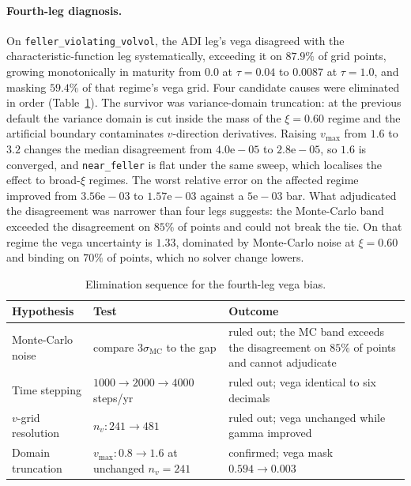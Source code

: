 \documentclass{article}
\begin{document}
\paragraph{Fourth-leg diagnosis.} On \texttt{feller\_violating\_volvol}, the ADI
leg's vega disagreed with the characteristic-function leg systematically, exceeding
it on $87.9\%$ of grid points, growing monotonically in maturity from $0.0$ at
$\tau = 0.04$ to $0.0087$ at $\tau = 1.0$, and masking $59.4\%$ of that regime's
vega grid. Four candidate causes were eliminated in order
(Table~\ref{tab:adi}). The survivor was variance-domain truncation: at the previous
default the variance domain is cut inside the mass of the $\xi = 0.60$ regime and
the artificial boundary contaminates $v$-direction derivatives. Raising $v_{\max}$
from $1.6$ to $3.2$ changes the median disagreement from $4.0\mathrm{e}{-}05$ to
$2.8\mathrm{e}{-}05$, so $1.6$ is converged, and \texttt{near\_feller} is flat under
the same sweep, which localises the effect to broad-$\xi$ regimes. The worst
relative error on the affected regime improved from $3.56\mathrm{e}{-}03$ to
$1.57\mathrm{e}{-}03$ against a $5\mathrm{e}{-}03$ bar. What adjudicated the
disagreement was narrower than four legs suggests: the Monte-Carlo band exceeded the
disagreement on $85\%$ of points and could not break the tie. On that regime the
vega uncertainty is $1.33$, dominated by Monte-Carlo noise at $\xi = 0.60$ and
binding on $70\%$ of points, which no solver change lowers.

\begin{table}[h]
\caption{Elimination sequence for the fourth-leg vega bias.}
\label{tab:adi}
\centering\footnotesize
\begin{tabular}{@{}lll@{}}
\toprule
Hypothesis & Test & Outcome \\
\midrule
Monte-Carlo noise & compare $3\sigma_{\mathrm{MC}}$ to the gap & ruled out; the MC band exceeds the disagreement on $85\%$ of points and cannot adjudicate \\
Time stepping & $1000 \to 2000 \to 4000$ steps/yr & ruled out; vega identical to six decimals \\
$v$-grid resolution & $n_v: 241 \to 481$ & ruled out; vega unchanged while gamma improved \\
Domain truncation & $v_{\max}: 0.8 \to 1.6$ at unchanged $n_v = 241$ & confirmed; vega mask $0.594 \to 0.003$ \\
\bottomrule
\end{tabular}
\end{table}
\end{document}
